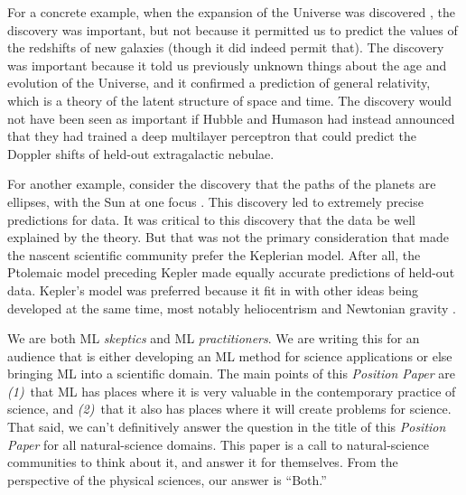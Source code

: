 \documentclass{article}
\newcommand{\documentname}{\textsl{Position Paper}}
\begin{document}
For a concrete example, when the expansion of the Universe was discovered \cite{expansion, expansion2}, the discovery was important, but not because it permitted us to predict the values of the redshifts of new galaxies (though it did indeed permit that).
The discovery was important because it told us previously unknown things about the age and evolution of the Universe, and it confirmed a prediction of general relativity, which is a theory of the latent structure of space and time.
The discovery would not have been seen as important if Hubble and Humason had instead announced that they had trained a deep multilayer perceptron that could predict the Doppler shifts of held-out extragalactic nebulae.

For another example, consider the discovery that the paths of the planets are ellipses, with the Sun at one focus \cite{kepler}.
This discovery led to extremely precise predictions for data.
It was critical to this discovery that the data be well explained by the theory.
But that was not the primary consideration that made the nascent scientific community prefer the Keplerian model.
After all, the Ptolemaic model preceding Kepler made equally accurate predictions of held-out data.
Kepler’s model was preferred because it fit in with other ideas being developed at the same time, most notably heliocentrism \cite{copernicus} and Newtonian gravity \cite{newton}.

We are both ML \emph{skeptics} and ML \emph{practitioners}.
We are writing this for an audience that is either developing an ML method for science applications or else bringing ML into a scientific domain.
The main points of this \documentname{} are \textsl{(1)}~that ML has places where it is very valuable in the contemporary practice of science, and \textsl{(2)}~that it also has places where it will create problems for science.
That said, we can't definitively answer the question in the title of this \documentname{} for all natural-science domains.
This paper is a call to natural-science communities to think about it, and answer it for themselves.
From the perspective of the physical sciences, our answer is ``Both.''
\end{document}

